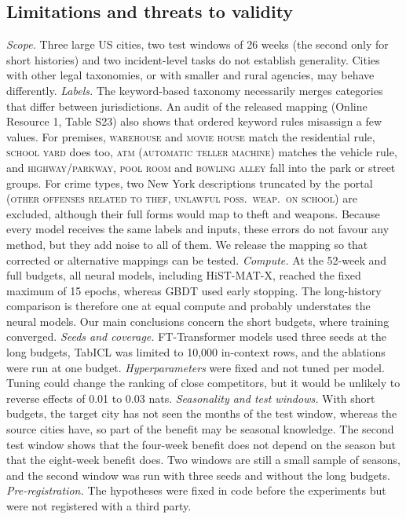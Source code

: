 \documentclass[11pt]{article}
\newcommand{\HMX}{HiST-MAT-X}
\begin{document}
\subsection{Limitations and threats to validity}\label{sec:limitations}
\emph{Scope.} Three large US cities, two test windows of 26 weeks (the second only for short histories) and two incident-level tasks do not establish generality. Cities with other legal taxonomies, or with smaller and rural agencies, may behave differently. \emph{Labels.} The keyword-based taxonomy necessarily merges categories that differ between jurisdictions. An audit of the released mapping (Online Resource 1, Table S23) also shows that ordered keyword rules misassign a few values. For premises, \textsc{warehouse} and \textsc{movie house} match the residential rule, \textsc{school yard} does too, \textsc{atm (automatic teller machine)} matches the vehicle rule, and \textsc{highway/parkway}, \textsc{pool room} and \textsc{bowling alley} fall into the park or street groups. For crime types, two New York descriptions truncated by the portal (\textsc{other offenses related to thef}, \textsc{unlawful poss.\ weap.\ on school}) are excluded, although their full forms would map to theft and weapons. Because every model receives the same labels and inputs, these errors do not favour any method, but they add noise to all of them. We release the mapping so that corrected or alternative mappings can be tested. \emph{Compute.} At the 52-week and full budgets, all neural models, including \HMX{}, reached the fixed maximum of 15 epochs, whereas GBDT used early stopping. The long-history comparison is therefore one at equal compute and probably understates the neural models. Our main conclusions concern the short budgets, where training converged. \emph{Seeds and coverage.} FT-Transformer models used three seeds at the long budgets, TabICL was limited to 10,000 in-context rows, and the ablations were run at one budget. \emph{Hyperparameters} were fixed and not tuned per model. Tuning could change the ranking of close competitors, but it would be unlikely to reverse effects of 0.01 to 0.03 nats. \emph{Seasonality and test windows.} With short budgets, the target city has not seen the months of the test window, whereas the source cities have, so part of the benefit may be seasonal knowledge. The second test window shows that the four-week benefit does not depend on the season but that the eight-week benefit does. Two windows are still a small sample of seasons, and the second window was run with three seeds and without the long budgets. \emph{Pre-registration.} The hypotheses were fixed in code before the experiments but were not registered with a third party.
\end{document}
